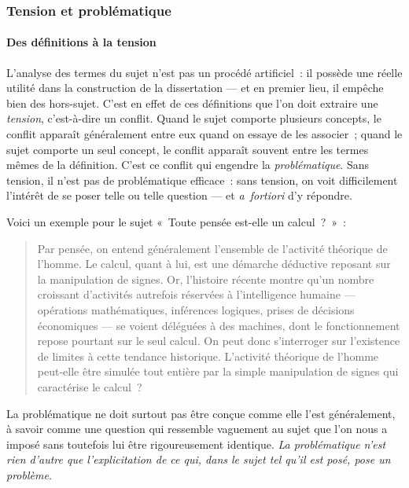 \documentclass[a4paper]{article}
\begin{document}
\subsubsection{Tension et problématique}
\label{sec-2-2-2}

\paragraph{Des définitions à la tension}
\label{sec-2-2-2-1}

L'analyse des termes du sujet n'est pas un procédé artificiel : il
possède une réelle utilité dans la construction de la dissertation ---
et en premier lieu, il empêche bien des hors-sujet. C'est en effet de
ces définitions que l'on doit extraire une \emph{tension}, c'est-à-dire un
conflit. Quand le sujet comporte plusieurs concepts, le conflit apparaît
généralement entre eux quand on essaye de les associer ; quand le sujet
comporte un seul concept, le conflit apparaît souvent entre les termes
mêmes de la définition. C'est ce conflit qui engendre la
\emph{problématique}. Sans tension, il n'est pas de problématique efficace :
sans tension, on voit difficilement l'intérêt de se poser telle ou telle
question --- et \emph{a fortiori} d'y répondre.

Voici un exemple pour le sujet « Toute pensée est-elle un calcul ? » :

\begin{quote}
Par pensée, on entend généralement l'ensemble de l'activité théorique
de l'homme. Le calcul, quant à lui, est une démarche déductive
reposant sur la manipulation de signes. Or, l'histoire récente montre
qu'un nombre croissant d'activités autrefois réservées à
l'intelligence humaine --- opérations mathématiques, inférences
logiques, prises de décisions économiques --- se voient déléguées à
des machines, dont le fonctionnement repose pourtant sur le seul
calcul. On peut donc s'interroger sur l'existence de limites à cette
tendance historique. L'activité théorique de l'homme peut-elle être
simulée tout entière par la simple manipulation de signes qui
caractérise le calcul ?
\end{quote}

La problématique ne doit surtout pas être conçue comme elle l'est
généralement, à savoir comme une question qui ressemble vaguement au
sujet que l'on nous a imposé sans toutefois lui être rigoureusement
identique. \emph{La problématique n'est rien d'autre que l'explicitation de
ce qui, dans le sujet tel qu'il est posé, pose un problème.} 
\end{document}
